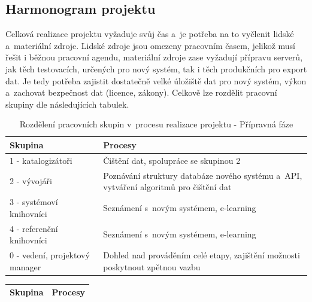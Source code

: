 \documentclass[
	11pt, oneside, printed, final, palatino, monochrome
	microtype,
	table,   %
	lof,     %
	lot     %
]{fithesis3}
\newcommand{\bold}[1]{\textbf{#1}}
\begin{document}
{\subsection{Harmonogram projektu}
Celková realizace projektu vyžaduje svůj čas a~je potřeba na to vyčlenit lidské a~materiální zdroje. Lidské zdroje jsou omezeny pracovním časem, jelikož musí řešit i běžnou pracovní agendu, materiální zdroje zase vyžadují přípravu serverů, jak těch testovacích, určených pro nový systém, tak i těch produkčních pro export dat. Je tedy potřeba zajistit dostatečně velké úložiště dat pro nový systém, výkon a~zachovat bezpečnost dat (licence, zákony). Celkově lze rozdělit pracovní skupiny dle následujících tabulek.

\begin{table}
    \centering
    \begin{tabular}{| p{3cm} | p{8.3cm} |}
    \hline
    \bold{Skupina} 	
    & 
    \bold{Procesy} 
    \\ \hline
    
    1 - katalogizátoři 
    & 
    Čištění dat, spolupráce se skupinou 2 
    \\ \hline
    
    2 - vývojáři 
    & 
	Poznávání struktury databáze nového systému a~API, vytváření algoritmů pro čištění dat	
    \\ \hline
    
    3 - systémoví knihovníci
    & 
    Seznámení s~novým systémem, e-learning
    \\ \hline
    
    4 - referenční knihovníci
    & 
    Seznámení s~novým systémem, e-learning
    \\ \hline

	0 - vedení, projektový manager
    & 
    Dohled nad prováděním celé etapy, zajištění možnosti poskytnout zpětnou vazbu
    \\ \hline
    
    \end{tabular}
    \caption{Rozdělení pracovních skupin v~procesu realizace projektu - Přípravná fáze}
\end{table}
    
\begin{table}
    \centering
    \begin{tabular}{| p{3cm} | p{8.3cm} |}
    \hline
    \bold{Skupina} 	
    & 
    \bold{Procesy} 
    \\ \hline
    

\end{tabular}
\end{table}}
\end{document}
